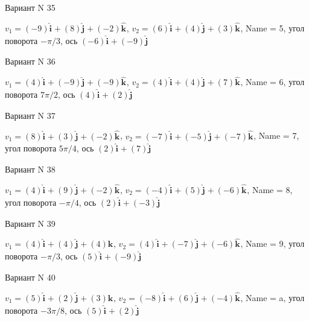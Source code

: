 \documentclass[11pt]{report}
\begin{document}
Вариант N 35

$v_1 = \left(-9\right)\mathbf{\hat{i}_{}} + \left(8\right)\mathbf{\hat{j}_{}} + \left(-2\right)\mathbf{\hat{k}_{}}$, $v_2 = \left(6\right)\mathbf{\hat{i}_{}} + \left(4\right)\mathbf{\hat{j}_{}} + \left(3\right)\mathbf{\hat{k}_{}}$, Name = 5, угол поворота $- \pi / 3$, ось $\left(-6\right)\mathbf{\hat{i}_{}} + \left(-9\right)\mathbf{\hat{j}_{}}$

Вариант N 36

$v_1 = \left(4\right)\mathbf{\hat{i}_{}} + \left(-9\right)\mathbf{\hat{j}_{}} + \left(-9\right)\mathbf{\hat{k}_{}}$, $v_2 = \left(4\right)\mathbf{\hat{i}_{}} + \left(4\right)\mathbf{\hat{j}_{}} + \left(7\right)\mathbf{\hat{k}_{}}$, Name = 6, угол поворота $7 \pi / 2$, ось $\left(4\right)\mathbf{\hat{i}_{}} + \left(2\right)\mathbf{\hat{j}_{}}$

Вариант N 37

$v_1 = \left(8\right)\mathbf{\hat{i}_{}} + \left(3\right)\mathbf{\hat{j}_{}} + \left(-2\right)\mathbf{\hat{k}_{}}$, $v_2 = \left(-7\right)\mathbf{\hat{i}_{}} + \left(-5\right)\mathbf{\hat{j}_{}} + \left(-7\right)\mathbf{\hat{k}_{}}$, Name = 7, угол поворота $5 \pi / 4$, ось $\left(2\right)\mathbf{\hat{i}_{}} + \left(7\right)\mathbf{\hat{j}_{}}$

Вариант N 38

$v_1 = \left(4\right)\mathbf{\hat{i}_{}} + \left(9\right)\mathbf{\hat{j}_{}} + \left(-2\right)\mathbf{\hat{k}_{}}$, $v_2 = \left(-4\right)\mathbf{\hat{i}_{}} + \left(5\right)\mathbf{\hat{j}_{}} + \left(-6\right)\mathbf{\hat{k}_{}}$, Name = 8, угол поворота $- \pi / 4$, ось $\left(2\right)\mathbf{\hat{i}_{}} + \left(-3\right)\mathbf{\hat{j}_{}}$

Вариант N 39

$v_1 = \left(4\right)\mathbf{\hat{i}_{}} + \left(4\right)\mathbf{\hat{j}_{}} + \left(4\right)\mathbf{\hat{k}_{}}$, $v_2 = \left(4\right)\mathbf{\hat{i}_{}} + \left(-7\right)\mathbf{\hat{j}_{}} + \left(-6\right)\mathbf{\hat{k}_{}}$, Name = 9, угол поворота $- \pi / 3$, ось $\left(5\right)\mathbf{\hat{i}_{}} + \left(-9\right)\mathbf{\hat{j}_{}}$

Вариант N 40

$v_1 = \left(5\right)\mathbf{\hat{i}_{}} + \left(2\right)\mathbf{\hat{j}_{}} + \left(3\right)\mathbf{\hat{k}_{}}$, $v_2 = \left(-8\right)\mathbf{\hat{i}_{}} + \left(6\right)\mathbf{\hat{j}_{}} + \left(-4\right)\mathbf{\hat{k}_{}}$, Name = a, угол поворота $- 3 \pi / 8$, ось $\left(5\right)\mathbf{\hat{i}_{}} + \left(2\right)\mathbf{\hat{j}_{}}$
\end{document}
